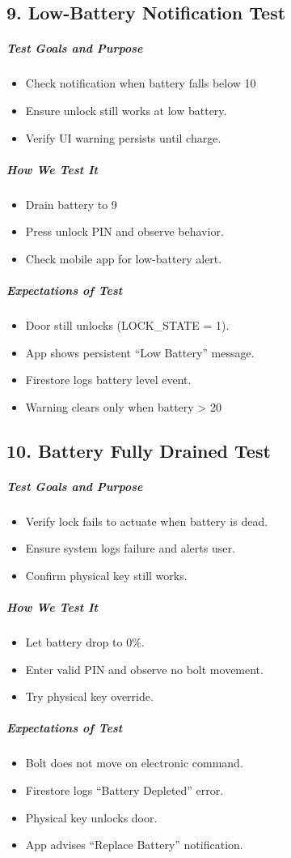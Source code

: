 \subsection*{9. Low-Battery Notification Test}
\subparagraph{Test Goals and Purpose}
\begin{itemize}
    \item Check notification when battery falls below 10 %
    \item Ensure unlock still works at low battery.
    \item Verify UI warning persists until charge.
\end{itemize}
\subparagraph{How We Test It}
\begin{itemize}
    \item Drain battery to 9 %
    \item Press unlock PIN and observe behavior.
    \item Check mobile app for low-battery alert.
\end{itemize}
\subparagraph{Expectations of Test}
\begin{itemize}
    \item Door still unlocks (LOCK\_STATE = 1).
    \item App shows persistent “Low Battery” message.
    \item Firestore logs battery level event.
    \item Warning clears only when battery > 20 %
\end{itemize}

\subsection*{10. Battery Fully Drained Test}
\subparagraph{Test Goals and Purpose}
\begin{itemize}
    \item Verify lock fails to actuate when battery is dead.
    \item Ensure system logs failure and alerts user.
    \item Confirm physical key still works.
\end{itemize}
\subparagraph{How We Test It}
\begin{itemize}
    \item Let battery drop to 0\%.
    \item Enter valid PIN and observe no bolt movement.
    \item Try physical key override.
\end{itemize}
\subparagraph{Expectations of Test}
\begin{itemize}
    \item Bolt does not move on electronic command.
    \item Firestore logs “Battery Depleted” error.
    \item Physical key unlocks door.
    \item App advises “Replace Battery” notification.
\end{itemize}


